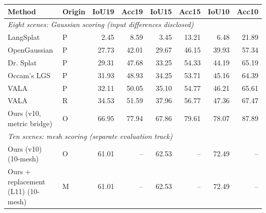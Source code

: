 \begin{tabular}{llrrrrrr}
\toprule
Method & Origin & IoU19 & Acc19 & IoU15 & Acc15 & IoU10 & Acc10 \\
\midrule
\midrule\multicolumn{8}{l}{\textit{Eight scenes: Gaussian scoring (input differences disclosed)}} \\
LangSplat \cite{vala} & P & 2.45 & 8.59 & 3.45 & 13.21 & 6.48 & 21.89 \\
OpenGaussian \cite{vala} & P & 27.73 & 42.01 & 29.67 & 46.15 & 39.93 & 57.34 \\
Dr. Splat \cite{vala} & P & 29.31 & 47.68 & 33.25 & 54.33 & 44.19 & 65.19 \\
Occam's LGS \cite{vala} & P & 31.93 & 48.93 & 34.25 & 53.71 & 45.16 & 64.39 \\
VALA \cite{vala} & P & 32.11 & 50.05 & 35.10 & 54.77 & 46.21 & 65.61 \\
VALA & R & 34.53 & 51.59 & 37.96 & 56.77 & 47.36 & 67.47 \\
Ours (v10, metric bridge) & O & 66.95 & 77.94 & 67.86 & 79.61 & 78.07 & 87.89 \\
\midrule\multicolumn{8}{l}{\textit{Ten scenes: mesh scoring (separate evaluation track)}} \\
Ours (v10) (10-mesh) & O & 61.01 & -- & 62.53 & -- & 72.49 & -- \\
Ours + replacement (L11) (10-mesh) & M & 61.01 & -- & 62.53 & -- & 72.49 & -- \\
\bottomrule
\end{tabular}
